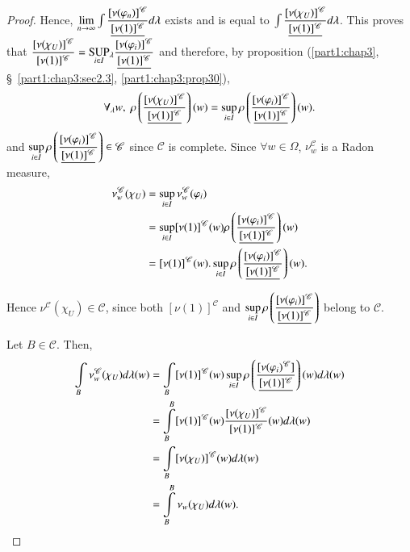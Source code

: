 \begin{proof}
Hence, $\lim\limits_{n\to \infty} \int \dfrac{[\nu
    (\varphi_n)]^\mathscr{C}}{\underline{[\nu(1)]^\mathscr{C}}}d \lambda$
exists and is equal to $\int
\dfrac{[\nu(\chi_U)]^\mathscr{C}}{\underline{[\nu(1)]^\mathscr{C}}}
d\lambda$. 
This proves that
$\dfrac{[\nu(\chi_U)]^\mathscr{C}}{[\nu(1)]^\mathscr{C}} =
\underset{i\in I}{\operatorname{SUP}}{}_\lambda
\dfrac{[\nu(\varphi_i)]^\mathscr{C}}{\underline{[\nu(1)]^\mathscr{C}}}$  and
therefore, by proposition (\ref{part1:chap3},
\S\ \ref{part1:chap3:sec2.3}, \ref{part1:chap3:prop30}), 
$$
\forall_\lambda w, \; \rho
\left(\frac{[\nu(\chi_U)]^\mathscr{C}}{\underline{[\nu(1)]^\mathscr{C}}}
\right)  (w) = \sup\limits_{i \in I} \rho
\left(\frac{[\nu(\varphi_i)]^\mathscr{C}}{\underline{[\nu(1)]^\mathscr{C}}}
\right) (w).   
$$\pageoriginale 
and $\sup\limits_{i \in I} \rho \left(\dfrac{[\nu
    (\varphi_i)]^\mathscr{C}}{\underline{[\nu(1)]^\mathscr{C}}} \right) \in
\mathscr{C}$   since $\mathscr{C}$ is complete. Since $\forall w
\in\Omega$, $\nu^\mathscr{C}_w$ is a Radon measure,
\begin{align*}
\nu^\mathscr{C}_w (\chi_U) & = \sup\limits_{i \in I}
\nu^{\mathscr{C}}_w(\varphi_i)\\
& = \sup\limits_{i \in I} [\nu(1)]^\mathscr{C} (w) \rho
\left(\frac{[\nu(\varphi_i)]^\mathscr{C}}{\underline{[\nu (1)]^\mathscr{C}}}
\right)(w)  \\
& = [\nu(1)]^\mathscr{C} (w). \sup\limits_{i \in I} \rho \left(
\frac{[\nu(\varphi_i)]^\mathscr{C}}{\underline{[\nu(1)]^\mathscr{C}}}  
\right) (w).
\end{align*}

Hence $\nu^\mathscr{C} (\chi_U) \in \mathscr{C}$, since both
$[\nu(1)]^\mathscr{C}$ and $\sup\limits_{i \in I} \rho \left(
\dfrac{[\nu
    (\varphi_i)]^\mathscr{C}}{\underline{[\nu(1)]^\mathscr{C}}}\right)$ belong
to $\mathscr{C}$. 

Let $B \in \mathscr{C}$. Then, 
\begin{align*}
\int\limits_B \nu^\mathscr{C}_w(\chi_U)d \lambda (w) & = \int\limits_B
           [\nu(1)]^\mathscr{C} (w) \sup\limits_{i \in I} \rho \left(
           \frac{[\nu(\varphi_i)^\mathscr{C}]}{\underline{[\nu(1)]^\mathscr{C}}}\right)
           (w) d \lambda (w)\\
& =\int\limits^B_B [\nu(1)]^\mathscr{C} (w)
           \frac{[\nu(\chi_U)]^\mathscr{C}}{[\nu(1)]^\mathscr{C}} (w)
           d\lambda (w)\\
& = \int\limits_B [\nu(\chi_U)]^\mathscr{C} (w) d \lambda(w)\\
& = \int\limits^B_B \nu_w(\chi_U) d \lambda(w). 
\end{align*}


\end{proof}
